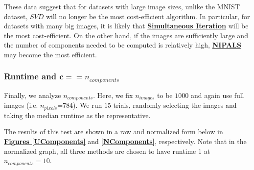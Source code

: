 \documentclass[12pt]{article}
\begin{document}
These data suggest that for datasets with large image sizes, unlike the MNIST dataset, $SVD$ will no longer be the most cost-efficient algorithm. In particular, for datasets with many big images, it is likely that \textbf{\hyperref[3.3]{Simultaneous Iteration}} will be the most cost-efficient. On the other hand, if the images are sufficiently large and the number of components needed to be computed is relatively high, \textbf{\hyperref[3.1]{NIPALS}} may become the most efficient.

\subsubsection{Runtime and $\textbf{c} == n_{components}$}\label{5.1.4}

Finally, we analyze $n_{components}$. Here, we fix $n_{images}$ to be $1000$ and again use full images (i.e. $n_{pixels}$=784). We run $15$ trials, randomly selecting the images and taking the median runtime as the representative.

The results of this test are shown in a raw and normalized form below in \textbf{\hyperref[UPixels]{Figures \ref*{UComponents}}} and \textbf{\hyperref[NPixels]{\ref*{NComponents}}}, respectively. Note that in the normalized graph, all three methods are chosen to have runtime $1$ at $n_{components} = 10$.
\end{document}
